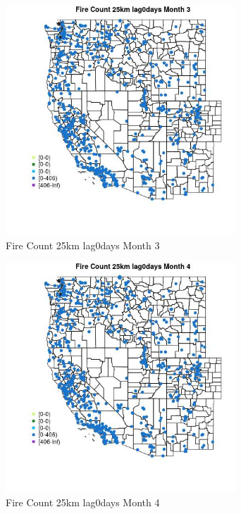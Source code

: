 \begin{figure} 
\centering  
\includegraphics[width=0.77\textwidth]{Code_Outputs/Report_ML_input_PM25_Step4_part_f_de_duplicated_aveswNAs_MapObsMo3Fire_Count_25km_lag0days.jpg} 
\caption{\label{fig:Report_ML_input_PM25_Step4_part_f_de_duplicated_aveswNAsMapObsMo3Fire_Count_25km_lag0days}Fire Count 25km lag0days Month 3} 
\end{figure} 
 

\begin{figure} 
\centering  
\includegraphics[width=0.77\textwidth]{Code_Outputs/Report_ML_input_PM25_Step4_part_f_de_duplicated_aveswNAs_MapObsMo4Fire_Count_25km_lag0days.jpg} 
\caption{\label{fig:Report_ML_input_PM25_Step4_part_f_de_duplicated_aveswNAsMapObsMo4Fire_Count_25km_lag0days}Fire Count 25km lag0days Month 4} 
\end{figure} 
 

